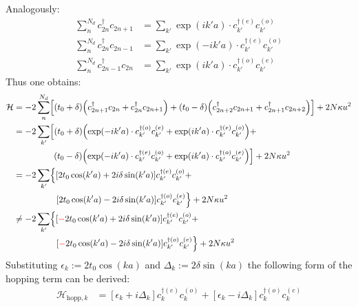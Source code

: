 Analogously:
\begin{align}
\sum_n^{N_d} c_{2n}^\dagger c_{2n+1} &=\sum_{k'} \exp\left(ik'a\right)\cdot c_{k'}^{\dagger(e)}c_{k'}^{(o)}\\
\sum_n^{N_d} c_{2n}^\dagger c_{2n-1}&=\sum_{k'} \exp\left(-ik'a\right)\cdot  c_{k'}^{\dagger(e)}c_{k'}^{(o)}\\
\sum_n^{N_d} c_{2n-1}^\dagger c_{2n} &=\sum_{k'} \exp\left(ik'a\right)\cdot  c_{k'}^{\dagger(o)}c_{k'}^{(e)}
\end{align}
Thus one obtains:
\begin{align}
\mathcal{H} &= -2\sum_n^{N_d} \left[\left(t_0+\delta\right)\left(c_{2n+1}^\dagger c_{2n} + c_{2n}^\dagger c_{2n+1} \right) + 
\left(t_0-\delta\right)\left(c_{2n+2}^\dagger c_{2n+1} + c_{2n+1}^\dagger c_{2n+2}\right)\right]+2N\kappa u^2\\
&= -2\sum_{k'} \left[\left(t_0+\delta\right)\left(\exp\left(-ik'a\right) \cdot c_{k'}^{\dagger(o)}c_{k'}^{(e)} + \exp\left(ik'a\right)\cdot c_{k'}^{\dagger(e)}c_{k'}^{(o)}\right)+ \right.\nonumber\\
&\hspace*{1.6cm}\left.\left(t_0-\delta\right)\left(\exp\left(-ik'a\right)\cdot  c_{k'}^{\dagger(e)}c_{k'}^{(o)}+\exp\left(ik'a\right)\cdot  c_{k'}^{\dagger(o)}c_{k'}^{(e)}\right)\right]+2N\kappa u^2\\
&= -2\sum_{k'} \left\{\left[2t_0\cos(k'a) + 2i\delta\sin(k'a)\right]c_{k'}^{\dagger(e)}c_{k'}^{(o)} + \right.\nonumber\\
&\hspace*{1.7cm}\left. \left[2t_0\cos(k'a)-2i\delta\sin(k'a)\right] c_{k'}^{\dagger(o)}c_{k'}^{(e)}\right\}+2N\kappa u^2\\
&\neq-2\sum_{k'} \left\{\left[\textcolor{red}{-}2t_0\cos(k'a) + 2i\delta\sin(k'a)\right]c_{k'}^{\dagger(e)}c_{k'}^{(o)} + \right.\nonumber\\
&\hspace*{1.7cm}\left. \left[\textcolor{red}{-}2t_0\cos(k'a)-2i\delta\sin(k'a)\right] c_{k'}^{\dagger(o)}c_{k'}^{(e)}\right\}+2N\kappa u^2
\end{align}
Substituting $\epsilon_k := 2t_0\cos(ka)$ and $\Delta_k := 2\delta\sin(ka)$ the following form of the hopping term can be derived:
\begin{align}
\mathcal{H}_{\text{hopp},k} &=
\left[\epsilon_k + i\Delta_k\right]c_{k}^{\dagger(e)}c_{k}^{(o)} + \left[\epsilon_k-i\Delta_k \right]	c_{k}^{\dagger(o)}c_{k}^{(e)}
\end{align}

